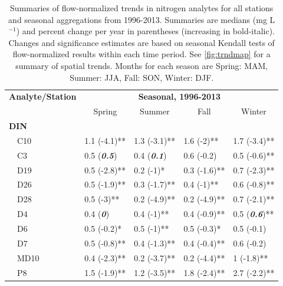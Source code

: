 \documentclass[journal = esthag, manuscript = article]{achemso}\usepackage[]{graphicx}\usepackage[]{color}
\begin{document}
\begin{table}[!tbp]
\caption{Summaries of flow-normalized trends in nitrogen analytes for all stations and seasonal aggregations from 1996-2013. Summaries are  medians (mg L$^{-1}$) and percent change per year in parentheses (increasing in bold-italic). Changes and significance estimates are based on seasonal Kendall tests of flow-normalized results within each time period. See \cref{fig:trndmap} for a summary of spatial trends. Months for each season are Spring: MAM, Summer: JJA, Fall: SON, Winter: DJF.\label{tab:trndsaft}} 
\begin{center}
\begin{tabular}{lllll}
\hline\hline
\multicolumn{1}{l}{\bfseries Analyte/Station}&\multicolumn{4}{c}{\bfseries Seasonal, 1996-2013}\tabularnewline
\cline{2-5}
\multicolumn{1}{l}{}&\multicolumn{1}{c}{Spring}&\multicolumn{1}{c}{Summer}&\multicolumn{1}{c}{Fall}&\multicolumn{1}{c}{Winter}\tabularnewline
\hline
{\bfseries DIN}&&&&\tabularnewline
~~C10&1.1 \footnotesize{(-4.1)**}&1.3 \footnotesize{(-3.1)**}&1.6 \footnotesize{(-2)**}&1.7 \footnotesize{(-3.4)**}\tabularnewline
~~C3&0.5 \footnotesize{(\textit{\textbf{0.5}})}&0.4 \footnotesize{(\textit{\textbf{0.1}})}&0.6 \footnotesize{(-0.2)}&0.5 \footnotesize{(-0.6)**}\tabularnewline
~~D19&0.5 \footnotesize{(-2.8)**}&0.2 \footnotesize{(-1)*}&0.3 \footnotesize{(-1.6)**}&0.7 \footnotesize{(-2.3)**}\tabularnewline
~~D26&0.5 \footnotesize{(-1.9)**}&0.3 \footnotesize{(-1.7)**}&0.4 \footnotesize{(-1)**}&0.6 \footnotesize{(-0.8)**}\tabularnewline
~~D28&0.5 \footnotesize{(-3)**}&0.2 \footnotesize{(-4.9)**}&0.2 \footnotesize{(-4.9)**}&0.7 \footnotesize{(-2.1)**}\tabularnewline
~~D4&0.4 \footnotesize{(\textit{\textbf{0}})}&0.4 \footnotesize{(-1)**}&0.4 \footnotesize{(-0.9)**}&0.5 \footnotesize{(\textit{\textbf{0.6}})**}\tabularnewline
~~D6&0.5 \footnotesize{(-0.2)*}&0.5 \footnotesize{(-1)**}&0.5 \footnotesize{(-0.3)*}&0.5 \footnotesize{(-0.1)}\tabularnewline
~~D7&0.5 \footnotesize{(-0.8)**}&0.4 \footnotesize{(-1.3)**}&0.4 \footnotesize{(-0.4)**}&0.6 \footnotesize{(-0.2)}\tabularnewline
~~MD10&0.4 \footnotesize{(-2.3)**}&0.2 \footnotesize{(-3.7)**}&0.2 \footnotesize{(-4.4)**}&1 \footnotesize{(-1.8)**}\tabularnewline
~~P8&1.5 \footnotesize{(-1.9)**}&1.2 \footnotesize{(-3.5)**}&1.8 \footnotesize{(-2.4)**}&2.7 \footnotesize{(-2.2)**}\tabularnewline

\end{tabular}
\end{center}
\end{table}
\end{document}
